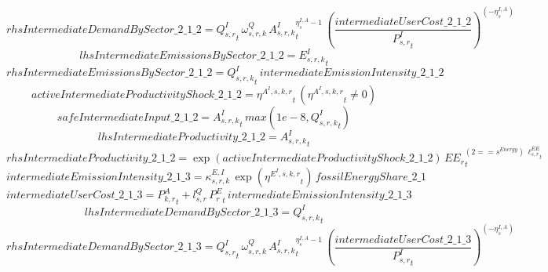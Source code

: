 \begin{dmath*}
rhsIntermediateDemandBySector\_2\_1\_2 = {{Q^{I}_{s,r}}}_{t}\, {{\omega^{Q}_{s,r,k}}}\, {{A^{I}_{s,r,k}}}_{t}^{{{\eta^{I,A}_{s}}}-1}\, \left(\frac{{intermediateUserCost\_2\_1\_2}}{{{P^{I}_{s,r}}}_{t}}\right)^{\left(-{{\eta^{I,A}_{s}}}\right)}
\end{dmath*}
\begin{dmath*}
lhsIntermediateEmissionsBySector\_2\_1\_2 = {{E^I_{s,r,k}}}_{t}
\end{dmath*}
\begin{dmath*}
rhsIntermediateEmissionsBySector\_2\_1\_2 = {{Q^{I}_{s,r,k}}}_{t}\, {intermediateEmissionIntensity\_2\_1\_2}
\end{dmath*}
\begin{dmath*}
activeIntermediateProductivityShock\_2\_1\_2 = {{\eta^{A^{I},s,k,r}}}_{t}\, \left({{\eta^{A^{I},s,k,r}}}_{t}\neq 0\right)
\end{dmath*}
\begin{dmath*}
safeIntermediateInput\_2\_1\_2 = {{A^{I}_{s,r,k}}}_{t}\, max(1e-8,{{Q^{I}_{s,r,k}}}_{t})
\end{dmath*}
\begin{dmath*}
lhsIntermediateProductivity\_2\_1\_2 = {{A^{I}_{s,r,k}}}_{t}
\end{dmath*}
\begin{dmath*}
rhsIntermediateProductivity\_2\_1\_2 = \exp\left({activeIntermediateProductivityShock\_2\_1\_2}\right)\, {{EE_r}}_{t}^{\left(2=={{s^{Energy}}}\right)\, {{\ell^{EE}_{s,r}}}_{t}}
\end{dmath*}
\begin{dmath*}
intermediateEmissionIntensity\_2\_1\_3 = {{\kappa^{E,I}_{s,r,k}}}\, \exp\left({{\eta^{E^{I},s,k,r}}}_{t}\right)\, {fossilEnergyShare\_2\_1}
\end{dmath*}
\begin{dmath*}
intermediateUserCost\_2\_1\_3 = {{P^{A}_{k,r}}}_{t}+{{l^{Q}_{s,r}}}\, {{P^E_r}}_{t}\, {intermediateEmissionIntensity\_2\_1\_3}
\end{dmath*}
\begin{dmath*}
lhsIntermediateDemandBySector\_2\_1\_3 = {{Q^{I}_{s,r,k}}}_{t}
\end{dmath*}
\begin{dmath*}
rhsIntermediateDemandBySector\_2\_1\_3 = {{Q^{I}_{s,r}}}_{t}\, {{\omega^{Q}_{s,r,k}}}\, {{A^{I}_{s,r,k}}}_{t}^{{{\eta^{I,A}_{s}}}-1}\, \left(\frac{{intermediateUserCost\_2\_1\_3}}{{{P^{I}_{s,r}}}_{t}}\right)^{\left(-{{\eta^{I,A}_{s}}}\right)}
\end{dmath*}
